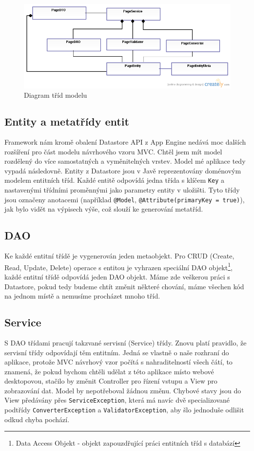 \begin{figure}[h]
\begin{center}
\includegraphics[width=5in]{figures/cms-uml.png}
\caption{Diagram tříd modelu}
\label{fig:modelUml}
\end{center}
\end{figure}

\subsection{Entity a metatřídy entit}
Framework nám kromě obalení Datastore API z App Engine nedává moc dalších rozšíření pro část modelu návrhového vzoru MVC. Chtěl jsem mít model rozdělený do více samostatných a vyměnitelných vrstev. Model mé aplikace tedy vypadá následovně. Entity z Datastore jsou v Javě reprezentovány doménovým modelem entitních tříd. Každé entitě odpovídá jedna třída s klíčem \verb|Key| a nastavenými třídními proměnnými jako parametry entity v uložišti. Tyto třídy jsou označeny anotacemi (například \verb|@Model|, \verb|@Attribute(primaryKey = true)|), jak bylo vidět na výpisech výše, což slouží ke generování metatříd. 

\subsection{DAO}
Ke každé entitní třídě je vygenerován jeden metaobjekt. Pro CRUD (Create, Read, Update, Delete) operace s entitou je vyhrazen speciální DAO objekt\footnote{Data Access Objekt - objekt zapouzdřující práci entitních tříd s databází}, každé entitní třídě odpovídá jeden DAO objekt. Máme zde veškerou práci s Datastore, pokud tedy budeme chtít změnit některé chování, máme všechen kód na jednom místě a nemusíme procházet mnoho tříd. 

\subsection{Service}
S DAO třídami pracují takzvané servisní (Service) třídy. Znovu platí pravidlo, že servisní třídy odpovídají těm entitním. Jedná se vlastně o naše rozhraní do aplikace, protože MVC návrhový vzor počítá s nahraditelností všech čátí, to znamená, že pokud bychom chtěli udělat z této aplikace místo webové desktopovou, stačilo by změnit Controller pro řízení vstupu a View pro zobrazování dat. Model by nepotřeboval žádnou změnu. Chybové stavy jsou do View předávány přes \verb|ServiceException|, která má navíc dvě specializované podtřídy \verb|ConverterException| a \verb|ValidatorException|, aby šlo jednoduše odlišit odkud chyba pochází. 

